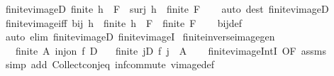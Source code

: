 \begin{isabellebody}
\endisatagproof
{\isafoldproof}%
%
\isadelimproof
\isanewline
%
\endisadelimproof
\isanewline
{}\isamarkupfalse%
\ finite{\isacharunderscore}{\kern0pt}vimageD{\isacharcolon}{\kern0pt}\ {\isachardoublequoteopen}finite\ {\isacharparenleft}{\kern0pt}h\ {\isacharminus}{\kern0pt}{\isacharbackquote}{\kern0pt}\ F{\isacharparenright}{\kern0pt}\ {\isasymLongrightarrow}\ surj\ h\ {\isasymLongrightarrow}\ finite\ F{\isachardoublequoteclose}\isanewline
%
\isadelimproof
\ \ %
\endisadelimproof
%
\isatagproof
{}\isamarkupfalse%
\ {\isacharparenleft}{\kern0pt}auto\ dest{\isacharcolon}{\kern0pt}\ finite{\isacharunderscore}{\kern0pt}vimageD{\isacharprime}{\kern0pt}{\isacharparenright}{\kern0pt}%
\endisatagproof
{\isafoldproof}%
%
\isadelimproof
\isanewline
%
\endisadelimproof
\isanewline
{}\isamarkupfalse%
\ finite{\isacharunderscore}{\kern0pt}vimage{\isacharunderscore}{\kern0pt}iff{\isacharcolon}{\kern0pt}\ {\isachardoublequoteopen}bij\ h\ {\isasymLongrightarrow}\ finite\ {\isacharparenleft}{\kern0pt}h\ {\isacharminus}{\kern0pt}{\isacharbackquote}{\kern0pt}\ F{\isacharparenright}{\kern0pt}\ {\isasymlongleftrightarrow}\ finite\ F{\isachardoublequoteclose}\isanewline
%
\isadelimproof
\ \ %
\endisadelimproof
%
\isatagproof
{}\isamarkupfalse%
\ bij{\isacharunderscore}{\kern0pt}def\ \isamarkupfalse%
\ {\isacharparenleft}{\kern0pt}auto\ elim{\isacharcolon}{\kern0pt}\ finite{\isacharunderscore}{\kern0pt}vimageD\ finite{\isacharunderscore}{\kern0pt}vimageI{\isacharparenright}{\kern0pt}%
\endisatagproof
{\isafoldproof}%
%
\isadelimproof
\isanewline
%
\endisadelimproof
\isanewline
{}\isamarkupfalse%
\ finite{\isacharunderscore}{\kern0pt}inverse{\isacharunderscore}{\kern0pt}image{\isacharunderscore}{\kern0pt}gen{\isacharcolon}{\kern0pt}\isanewline
\ \ \ {\isachardoublequoteopen}finite\ A{\isachardoublequoteclose}\ {\isachardoublequoteopen}inj{\isacharunderscore}{\kern0pt}on\ f\ D{\isachardoublequoteclose}\isanewline
\ \ \ {\isachardoublequoteopen}finite\ {\isacharbraceleft}{\kern0pt}j{\isasymin}D{\isachardot}{\kern0pt}\ f\ j\ {\isasymin}\ A{\isacharbraceright}{\kern0pt}{\isachardoublequoteclose}\isanewline
%
\isadelimproof
\ \ %
\endisadelimproof
%
\isatagproof
{}\isamarkupfalse%
\ finite{\isacharunderscore}{\kern0pt}vimage{\isacharunderscore}{\kern0pt}IntI\ {\isacharbrackleft}{\kern0pt}OF\ assms{\isacharbrackright}{\kern0pt}\isanewline
\ \ \isamarkupfalse%
\ {\isacharparenleft}{\kern0pt}simp\ add{\isacharcolon}{\kern0pt}\ Collect{\isacharunderscore}{\kern0pt}conj{\isacharunderscore}{\kern0pt}eq\ inf{\isacharunderscore}{\kern0pt}commute\ vimage{\isacharunderscore}{\kern0pt}def{\isacharparenright}{\kern0pt}%

\end{isabellebody}
